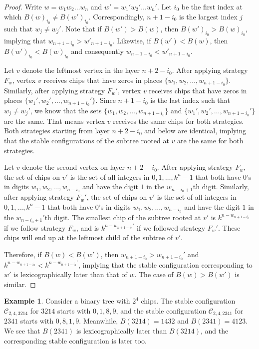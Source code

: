 \documentclass[final]{dmtcs-episciences}
\theoremstyle{definition}
\newtheorem{example}{Example}
\theoremstyle{remark}
\begin{document}
\begin{proof}
Write $w =w_1w_2\dots w_n$ and $w'= w_1'w_2'\dots w_n'$. Let $i_0$ be the first index at which $B(w)_{i_0} \neq B(w')_{i_0}$. Correspondingly, $n+1-i_0$ is the largest index $j$ such that $w_{j} \neq w_j'$. Note that if $B(w') > B(w)$, then $B(w')_{i_0} > B(w)_{i_0}$, implying that $w_{n+1-i_0} > w'_{n+1-i_0}$. Likewise, if $B(w') < B(w)$, then $B(w')_{i_0} < B(w)_{i_0}$ and consequently $w_{n+1-i_0} < w'_{n+1-i_0}$.

Let $v$ denote the leftmost vertex in the layer $n+2-i_0$. After applying strategy $F_w$, vertex $v$ receives chips that have zeros in places $\{w_1, w_2, \dots, w_{n+1-i_0}\}$. Similarly, after applying strategy $F_w'$, vertex $v$ receives chips that have zeros in places $\{w_1', w_2', \dots, w_{n+1-i_0}'\}$. Since $n+1-i_0$ is the last index such that $w_j\neq w_j'$, we know that the sets $\{w_1, w_2, \dots, w_{n+1-i_0}\}$ and $\{w_1', w_2', \dots, w_{n+1-i_0}'\}$ are the same. That means vertex $v$ receives the same chips for both strategies. Both strategies starting from layer $n+2-i_0$ and below are identical, implying that the stable configurations of the subtree rooted at $v$ are the same for both strategies.

Let $v$ denote the second vertex on layer $n+2-i_0$. After applying strategy $F_w$, the set of chips on $v'$ is the set of all integers in $0,1,\dots, k^n-1$ that both have $0$'s in digits $w_1,w_2, \dots, w_{n-i_0}$ and have the digit $1$ in the $w_{n-i_0+1}$th digit. Similarly, after applying strategy $F_w'$, the set of chips on $v'$ is the set of all integers in $0,1,\dots, k^n-1$ that both have $0$'s in digits $w_1,w_2, \dots, w_{n-i_0}$ and have the digit $1$ in the $w_{n-i_0+1}'$th digit. The smallest chip of the subtree rooted at $v'$ is $k^{n-w_{n+1-i_0}}$ if we follow strategy $F_w$, and is $k^{n-w_{n+1-i_0}'}$ if we followed strategy $F_w'$. These chips will end up at the leftmost child of the subtree of $v'$.

Therefore, if $B(w) < B(w')$, then $w_{n+1-i_0} > w_{n+1-i_0}'$ and $k^{n-w_{n+1-i_0}} < k^{n-w_{n+1-i_0}'}$, implying that the stable configuration corresponding to $w'$ is lexicographically later than that of $w$. The case of $B(w) > B(w')$ is similar.
\end{proof}

\begin{example}
Consider a binary tree with $2^4$ chips. The stable configuration $\mathcal{C}_{2, 4, 3214}$ for $3214$ starts with $0, 1, 8, 9$, and the stable configuration $\mathcal{C}_{2, 4, 2341}$ for $2341$ starts with $0, 8, 1, 9$. Meanwhile, $B(3214) = 1432$ and $B(2341) = 4123$. We see that $B(2341)$ is lexicographically later than $B(3214)$, and the corresponding stable configuration is later too.
\end{example}
\end{document}

